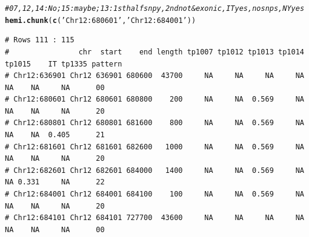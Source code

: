 \documentclass{article}\usepackage[]{graphicx}\usepackage[]{color}
\makeatletter
\newcommand{\hlstr}[1]{\textcolor[rgb]{0.192,0.494,0.8}{#1}}%
\newcommand{\hlcom}[1]{\textcolor[rgb]{0.678,0.584,0.686}{\textit{#1}}}%
\newcommand{\hlstd}[1]{\textcolor[rgb]{0.345,0.345,0.345}{#1}}%
\newcommand{\hlkwd}[1]{\textcolor[rgb]{0.737,0.353,0.396}{\textbf{#1}}}%
\newenvironment{kframe}{%
 \def\at@end@of@kframe{}%
 \ifinner\ifhmode%
  \def\at@end@of@kframe{\end{minipage}}%
  \begin{minipage}{\columnwidth}%
 \fi\fi%
 \def\FrameCommand##1{\hskip\@totalleftmargin \hskip-\fboxsep
 \colorbox{shadecolor}{##1}\hskip-\fboxsep
     \hskip-\linewidth \hskip-\@totalleftmargin \hskip\columnwidth}%
 \MakeFramed {\advance\hsize-\width
   \@totalleftmargin\z@ \linewidth\hsize
   \@setminipage}}%
 {\par\unskip\endMakeFramed%
 \at@end@of@kframe}
\newenvironment{knitrout}{}{} %
\makeatother
\begin{document}
\begin{knitrout}\footnotesize
{}\color{fgcolor}\begin{kframe}
\begin{alltt}
\hlcom{# 07,12,14:No; 15: maybe; 13:1st half snpy, 2nd not & exonic, IT yes, no snps, NY yes}
\hlkwd{hemi.chunk}\hlstd{(}\hlkwd{c}\hlstd{(}\hlstr{'Chr12:680601'}\hlstd{,}\hlstr{'Chr12:684001'}\hlstd{))}
\end{alltt}
\begin{verbatim}
# Rows 111 : 115 
#                chr  start    end length tp1007 tp1012 tp1013 tp1014 tp1015    IT tp1335 pattern
# Chr12:636901 Chr12 636901 680600  43700     NA     NA     NA     NA     NA    NA     NA      00
# Chr12:680601 Chr12 680601 680800    200     NA     NA  0.569     NA     NA    NA     NA      20
# Chr12:680801 Chr12 680801 681600    800     NA     NA  0.569     NA     NA    NA  0.405      21
# Chr12:681601 Chr12 681601 682600   1000     NA     NA  0.569     NA     NA    NA     NA      20
# Chr12:682601 Chr12 682601 684000   1400     NA     NA  0.569     NA     NA 0.331     NA      22
# Chr12:684001 Chr12 684001 684100    100     NA     NA  0.569     NA     NA    NA     NA      20
# Chr12:684101 Chr12 684101 727700  43600     NA     NA     NA     NA     NA    NA     NA      00
\end{verbatim}
\end{kframe}


\end{knitrout}
\end{document}
